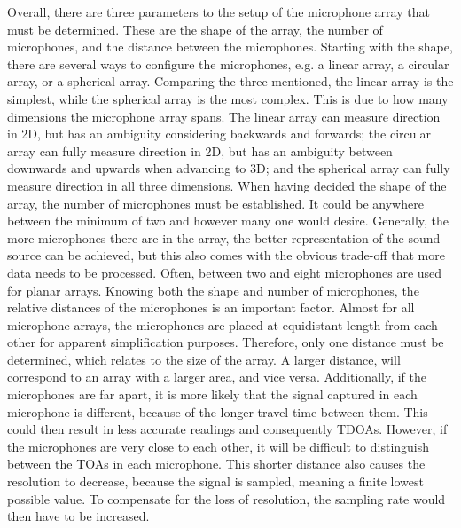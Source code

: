 Overall, there are three parameters to the setup of the microphone array that must be determined. These are the shape of the array, the number of microphones, and the distance between the microphones. Starting with the shape, there are several ways to configure the microphones, e.g. a linear array, a circular array, or a spherical array. Comparing the three mentioned, the linear array is the simplest, while the spherical array is the most complex. This is due to how many dimensions the microphone array spans. The linear array can measure direction in 2D, but has an ambiguity considering backwards and forwards; the circular array can fully measure direction in 2D, but has an ambiguity between downwards and upwards when advancing to 3D; and the spherical array can fully measure direction in all three dimensions. When having decided the shape of the array, the number of microphones must be established. It could be anywhere between the minimum of two and however many one would desire. Generally, the more microphones there are in the array, the better representation of the sound source can be achieved, but this also comes with the obvious trade-off that more data needs to be processed. Often, between two and eight microphones are used for planar arrays. Knowing both the shape and number of microphones, the relative distances of the microphones is an important factor. Almost for all microphone arrays, the microphones are placed at equidistant length from each other for apparent simplification purposes. Therefore, only one distance must be determined, which relates to the size of the array. A larger distance, will correspond to an array with a larger area, and vice versa. Additionally, if the microphones are far apart, it is more likely that the signal captured in each microphone is different, because of the longer travel time between them. This could then result in less accurate readings and consequently \gls{TDOA}s. However, if the microphones are very close to each other, it will be difficult to distinguish between the \gls{TOA}s in each microphone. This shorter distance also causes the resolution to decrease, because the signal is sampled, meaning a finite lowest possible value. To compensate for the loss of resolution, the sampling rate would then have to be increased. \cite{Acoustics:Handbook_of_Acoustics}

